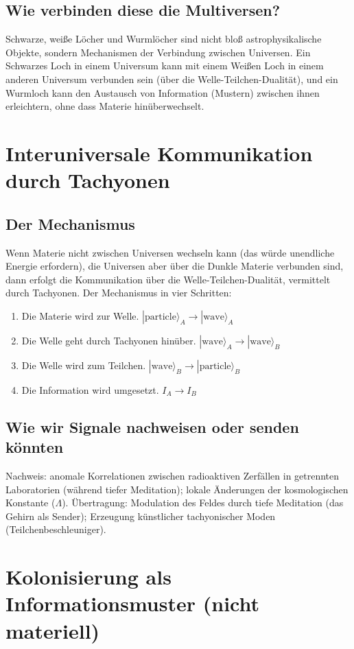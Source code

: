 \documentclass[11pt,a4paper]{article}
\begin{document}
\subsection{Wie verbinden diese die Multiversen?}
Schwarze, weiße Löcher und Wurmlöcher sind nicht bloß astrophysikalische Objekte, sondern Mechanismen der Verbindung zwischen Universen. Ein Schwarzes Loch in einem Universum kann mit einem Weißen Loch in einem anderen Universum verbunden sein (über die Welle-Teilchen-Dualität), und ein Wurmloch kann den Austausch von Information (Mustern) zwischen ihnen erleichtern, ohne dass Materie hinüberwechselt.

\section{Interuniversale Kommunikation durch Tachyonen}
\subsection{Der Mechanismus}
Wenn Materie nicht zwischen Universen wechseln kann (das würde unendliche Energie erfordern), die Universen aber über die Dunkle Materie verbunden sind, dann erfolgt die Kommunikation über die Welle-Teilchen-Dualität, vermittelt durch Tachyonen. Der Mechanismus in vier Schritten:
\begin{enumerate}
    \item Die Materie wird zur Welle. $|\text{particle}\rangle_A \to |\text{wave}\rangle_A$
    \item Die Welle geht durch Tachyonen hinüber. $|\text{wave}\rangle_A \to |\text{wave}\rangle_B$
    \item Die Welle wird zum Teilchen. $|\text{wave}\rangle_B \to |\text{particle}\rangle_B$
    \item Die Information wird umgesetzt. $I_A \to I_B$
\end{enumerate}

\subsection{Wie wir Signale nachweisen oder senden könnten}
Nachweis: anomale Korrelationen zwischen radioaktiven Zerfällen in getrennten Laboratorien (während tiefer Meditation); lokale Änderungen der kosmologischen Konstante ($\Lambda$). Übertragung: Modulation des Feldes durch tiefe Meditation (das Gehirn als Sender); Erzeugung künstlicher tachyonischer Moden (Teilchenbeschleuniger).

\section{Kolonisierung als Informationsmuster (nicht materiell)}
\end{document}

